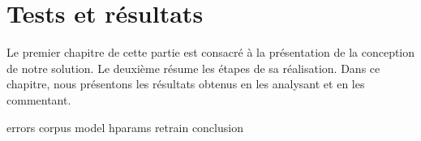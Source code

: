 \chapter{Tests et résultats}%
\label{chap.results}

Le premier chapitre de cette partie est consacré à la présentation de la conception de notre solution.
Le deuxième résume les étapes de sa réalisation.
Dans ce chapitre, nous présentons les résultats obtenus en les analysant et en les commentant.

{errors}
{corpus}
{model}
{hparams}
{retrain}
{conclusion}